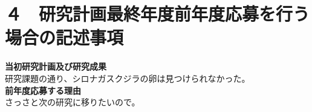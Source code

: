 \documentclass[11pt,a4j,dvipdfmx]{jarticle} 					%
\newcommand{\研究課題名}{象の卵}
\newcommand{\研究機関名}{逢坂大学}
\newcommand{\研究代表者氏名}{湯川秀樹}
\newcommand{\研究期間の最終元号年度}{8}  %
\begin{document}



\section{４　研究計画最終年度前年度応募を行う場合の記述事項}

\newcommand{\最終年度研究種目名}{基盤研究（Z）}
\newcommand{\最終年度研究課題番号}{99999}
\newcommand{\最終年度研究課題名}{シロナガスクジラの卵はなぜ見つけられないのか}
\newcommand{\最終年度研究期間}{平成25年度〜令和\一年目 年度}


\noindent
\textbf{当初研究計画及び研究成果}\\
	研究課題の通り、シロナガスクジラの卵は見つけられなかった。
\\

\noindent
\textbf{前年度応募する理由}\\
	さっさと次の研究に移りたいので。



\end{document}
